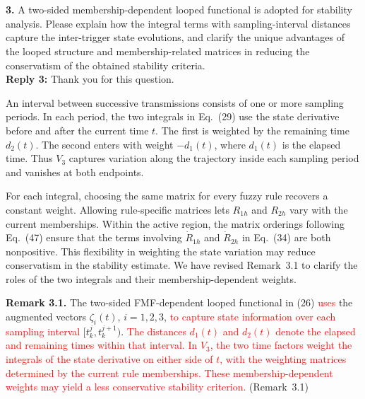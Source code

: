 \documentclass[10pt,fleqn]{article}
\begin{document}
~\\
\\
\textbf{3.} A two-sided membership-dependent looped functional is adopted for stability analysis. Please explain how the integral terms with sampling-interval distances capture the inter-trigger state evolutions, and clarify the unique advantages of the looped structure and membership-related matrices in reducing the conservatism of the obtained stability criteria.
\\[10pt]
\indent \textbf{Reply 3:} Thank you for this question.\par
{\setlength{\parskip}{5pt}\indent An interval between successive transmissions consists of one or more sampling periods. In each period, the two integrals in Eq.~(29) use the state derivative before and after the current time $t$. The first is weighted by the remaining time $d_2(t)$. The second enters with weight $-d_1(t)$, where $d_1(t)$ is the elapsed time. Thus $V_3$ captures variation along the trajectory inside each sampling period and vanishes at both endpoints.\par
\indent For each integral, choosing the same matrix for every fuzzy rule recovers a constant weight. Allowing rule-specific matrices lets $R_{1h}$ and $R_{2h}$ vary with the current memberships. Within the active region, the matrix orderings following Eq.~(47) ensure that the terms involving $\dot R_{1h}$ and $\dot R_{2h}$ in Eq.~(34) are both nonpositive. This flexibility in weighting the state variation may reduce conservatism in the stability estimate. We have revised Remark~3.1 to clarify the roles of the two integrals and their membership-dependent weights.\par
\noindent \textbf{Remark 3.1.} The two-sided FMF-dependent looped functional in (26) \textcolor{red}{uses} the augmented vectors $\zeta_i(t)$, $i=1,2,3$, \textcolor{red}{to capture state information over each sampling interval} $[t_k^j,t_k^{j+1})$. \textcolor{red}{The distances $d_1(t)$ and $d_2(t)$ denote the elapsed and remaining times within that interval.} \textcolor{red}{In $V_3$, the two time factors weight the integrals of the state derivative on either side of $t$, with the weighting matrices determined by the current rule memberships.} \textcolor{red}{These membership-dependent weights may yield a less conservative stability criterion.} \mbox{(Remark~3.1)}\par}
\end{document}
